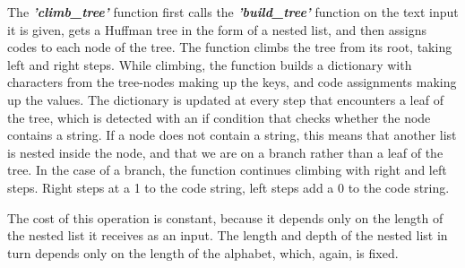 \documentclass[11pt]{article}
\begin{document}
    The \textbf{\emph{'climb\_tree'}} function first calls the
\textbf{\emph{'build\_tree'}} function on the text input it is given,
gets a Huffman tree in the form of a nested list, and then assigns codes
to each node of the tree. The function climbs the tree from its root,
taking left and right steps. While climbing, the function builds a
dictionary with characters from the tree-nodes making up the keys, and
code assignments making up the values. The dictionary is updated at
every step that encounters a leaf of the tree, which is detected with an
if condition that checks whether the node contains a string. If a node
does not contain a string, this means that another list is nested inside
the node, and that we are on a branch rather than a leaf of the tree. In
the case of a branch, the function continues climbing with right and
left steps. Right steps at a 1 to the code string, left steps add a 0 to
the code string.

The cost of this operation is constant, because it depends only on the
length of the nested list it receives as an input. The length and depth
of the nested list in turn depends only on the length of the alphabet,
which, again, is fixed.
\end{document}
